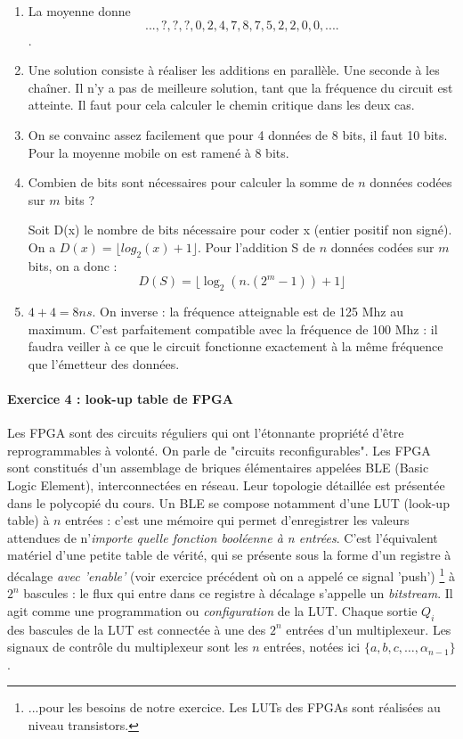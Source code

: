 \documentclass[a4paper,11pt]{article}
\begin{document}
\begin{enumerate}
  \item La moyenne donne $$...,?,?,?,0,2,4,7,8,7,5,2,2,0,0,....$$.
  \item Une solution consiste à réaliser les additions en parallèle. Une seconde à les chaîner. Il n'y a pas de meilleure solution, tant que la fréquence du circuit est atteinte. Il faut pour cela
  calculer le chemin critique dans les deux cas.
  \item On se convainc assez facilement que pour 4 données de 8 bits, il faut 10 bits. Pour la moyenne mobile on est ramené à 8 bits.
  \item Combien de bits sont nécessaires pour calculer la somme de $n$ données codées sur $m$ bits ?

   Soit D(x) le nombre de bits nécessaire pour coder x (entier positif non signé).
  On a $D(x)=\lfloor log_2(x) + 1 \rfloor$. Pour l'addition S de $n$ données codées sur $m$ bits, on a donc :
  $$D(S)=\lfloor \log_2(n.(2^m-1)) + 1 \rfloor $$

  \item $4+4=8 ns$. On inverse : la fréquence atteignable est de 125 Mhz au maximum. C'est parfaitement compatible avec la fréquence de 100 Mhz : il faudra veiller à ce que le circuit fonctionne exactement à la même fréquence que l'émetteur
  des données.
\end{enumerate}

\paragraph{Exercice 4 : look-up table de FPGA} Les FPGA sont des circuits réguliers qui ont l'étonnante propriété d'être reprogrammables à volonté. On parle de "circuits reconfigurables".
Les FPGA sont constitués d'un assemblage de briques élémentaires appelées BLE (Basic Logic Element), interconnectées en réseau.
Leur topologie détaillée est présentée dans le polycopié du cours. Un BLE se compose notamment d'une LUT (look-up table) à $n$ entrées : c'est une mémoire qui permet d'enregistrer
les valeurs attendues de n'{\it importe quelle fonction booléenne à n entrées}.
C'est l'équivalent matériel d'une petite table de vérité, qui se présente sous la forme d'un
registre à décalage {\it avec 'enable'} (voir exercice précédent où on a appelé ce signal 'push')
\footnote{...pour les besoins de
notre exercice. Les LUTs des FPGAs sont réalisées au niveau transistors.}
à $2^n$ bascules : le flux qui entre dans ce registre à décalage s'appelle un {\it bitstream}. Il agit comme une programmation  ou {\it configuration} de la LUT.
Chaque sortie $Q_i$ des bascules de la LUT est connectée à une des $2^n$ entrées d'un multiplexeur.
Les signaux de contrôle du multiplexeur sont les $n$ entrées, notées ici $\{a,b,c,\dots,\alpha_{n-1}\}$.
\end{document}
